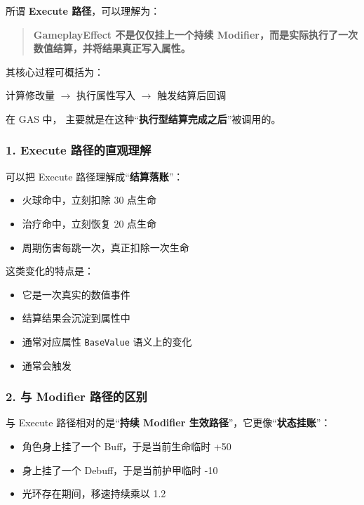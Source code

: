 \documentclass[10pt,CJKmath]{ctexart}
\begin{document}
所谓 \textbf{Execute 路径}，可以理解为：

\begin{quote}
	\textbf{GameplayEffect 不是仅仅挂上一个持续 Modifier，而是实际执行了一次数值结算，并将结果真正写入属性。}
\end{quote}

其核心过程可概括为：

\begin{center}
	计算修改量 $\rightarrow$ 执行属性写入 $\rightarrow$ 触发结算后回调
\end{center}

在 GAS 中， 主要就是在这种“\textbf{执行型结算完成之后}”被调用的。

\subsubsection{1. Execute 路径的直观理解}

可以把 Execute 路径理解成“\textbf{结算落账}”：

\begin{itemize}
	\item 火球命中，立刻扣除 30 点生命
	\item 治疗命中，立刻恢复 20 点生命
	\item 周期伤害每跳一次，真正扣除一次生命
\end{itemize}

这类变化的特点是：

\begin{itemize}
	\item 它是一次真实的数值事件
	\item 结算结果会沉淀到属性中
	\item 通常对应属性 \verb|BaseValue| 语义上的变化
	\item 通常会触发 
\end{itemize}

\subsubsection{2. 与 Modifier 路径的区别}

与 Execute 路径相对的是“\textbf{持续 Modifier 生效路径}”，它更像“\textbf{状态挂账}”：

\begin{itemize}
	\item 角色身上挂了一个 Buff，于是当前生命临时 +50
	\item 身上挂了一个 Debuff，于是当前护甲临时 -10
	\item 光环存在期间，移速持续乘以 1.2
\end{itemize}
\end{document}
